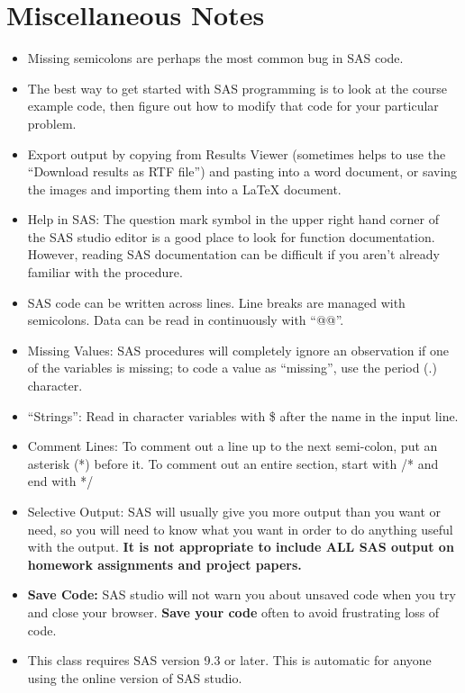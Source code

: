 \documentclass[12pt]{../notes}
\begin{document}
\section{Miscellaneous Notes}
\begin{itemize}
\item Missing semicolons are perhaps the most common bug in SAS code. 
\item The best way to get started with SAS programming is to look at the course example code, then figure out how to modify that code for your particular problem. 
\item Export output by copying from Results Viewer (sometimes helps to use the ``Download results as RTF file'') and pasting into a word document, or saving the images and importing them into a LaTeX document. 
\item Help in SAS: The question mark symbol in the upper right hand corner of the SAS studio editor is a good place to look for function documentation. However, reading SAS documentation can be difficult if you aren't already familiar with the procedure.  
\item SAS code can be written across lines. Line breaks are managed with semicolons. Data can be read in continuously with ``@@''.
\item Missing Values: SAS procedures will completely ignore an observation if one of the variables is missing; to code a value as ``missing'', use the period (.) character. 
\item ``Strings'': Read in character variables with \$ after the name in the input line.
\item Comment Lines: To comment out a line up to the next semi-colon, put an asterisk (*) before it. To comment out an entire section, start with /* and end with */
\item Selective Output: SAS will usually give you more output than you want or need, so you will need to know what you want in order to do anything useful with the output. \textbf{It is not appropriate to include ALL SAS output on homework assignments and project papers.}
\item \textbf{Save Code:} SAS studio will not warn you about unsaved code when you try and close your browser. \textbf{Save your code} often to avoid frustrating loss of code. 
\item This class requires SAS version 9.3 or later. This is automatic for anyone using the online version of SAS studio.
\end{itemize}
\end{document}
